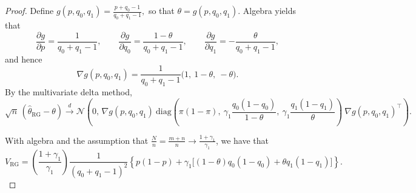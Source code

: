 \begin{proof}
\noindent
Define $
g(p,q_0,q_1)=\frac{p+q_0-1}{q_0+q_1-1},$
so that $\theta=g(p,q_0,q_1)$. Algebra yields that
\[
\frac{\partial g}{\partial p}=\frac{1}{q_0+q_1-1},\qquad
\frac{\partial g}{\partial q_0}=\frac{1-\theta}{q_0+q_1-1},\qquad
\frac{\partial g}{\partial q_1}=-\frac{\theta}{q_0+q_1-1},
\]
and hence
\[
\nabla g(p,q_0,q_1)
=
\frac{1}{q_0+q_1-1}\bigl(1,\ 1-\theta,\ -\theta\bigr).
\]
By the multivariate delta method,
\[
\sqrt{n}\,(\hat\theta_{\mathrm{RG}}-\theta)
\xrightarrow{d}
\mathcal{N}\!\left(
0,\,
\nabla g(p,q_0,q_1)\ 
\mathrm{diag}\!\left(
\pi(1-\pi),\
\gamma_1\frac{q_0(1-q_0)}{1-\theta},\
\gamma_1\frac{q_1(1-q_1)}{\theta}
\right)\ 
\nabla g(p,q_0,q_1)^\top
\right).
\]

With algebra and the assumption that $\frac{N}{n}= \frac{m+n}{n}\to \frac{1+\gamma_1}{\gamma_1}$, we have that
\[
V_{\mathrm{RG}}
=
\left(\frac{1+\gamma_1}{\gamma_1}\right)\frac{1}{(q_0+q_1-1)^2}
\left\{
p(1-p)
+\gamma_1\bigl[(1-\theta)q_0(1-q_0)+\theta q_1(1-q_1)\bigr]
\right\}.
\]

\noindent

\end{proof}


